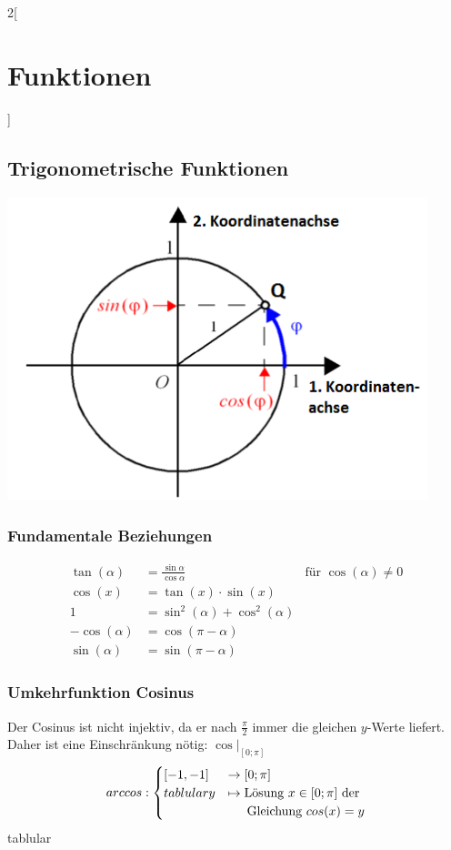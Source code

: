 \begin{multicols}{2}[
	\section{Funktionen}
]
\subsection{Trigonometrische Funktionen}
	
	\includegraphics[scale=0.33]{img/einheitskreis_sin_cos.png}
	
\subsubsection{Fundamentale Beziehungen}

	\begin{align*}
		\tan(\alpha) &= \frac{\sin \alpha}{\cos \alpha} & \text{für } \cos(\alpha) \neq 0 \\
		\cos(x) &= \tan(x) \cdot \sin(x) \\ %
		 1 &=  \sin^2(\alpha) + \cos^2(\alpha) \\
		 -\cos(\alpha) &= \cos(\pi - \alpha) \\
		 \sin(\alpha) &= \sin(\pi - \alpha)
	\end{align*}
	
\subsubsection{Umkehrfunktion Cosinus}

	Der Cosinus ist nicht injektiv, da er nach $\frac{\pi}{2}$ immer die gleichen $y$-Werte liefert. Daher ist eine Einschränkung nötig:
	$\cos|_{[0;\pi]}$
	\[
		arccos : \begin{cases}
			[-1, -1] &\to [0;\pi]\\tablular
			y &\mapsto \text{Lösung } x \in [0;\pi] \text{ der}\\
			  &\indent \text{Gleichung }  cos(x) = y
		\end{cases}
	\]tablular
	

\end{multicols}

